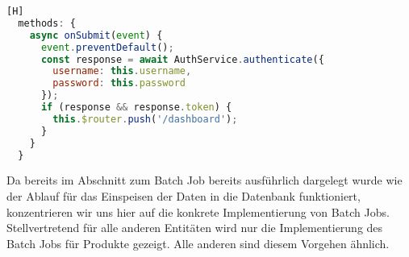 \begin{lstlisting}[language=JavaScript,caption=Ausschnitt aus src/views/Login.vue][H]
  methods: {
    async onSubmit(event) {
      event.preventDefault();
      const response = await AuthService.authenticate({
        username: this.username,
        password: this.password
      });
      if (response && response.token) {
        this.$router.push('/dashboard');
      }
    }
  }
\end{lstlisting}





Da bereits im Abschnitt zum Batch Job bereits ausführlich dargelegt wurde wie der Ablauf für das Einspeisen der Daten in die Datenbank funktioniert, konzentrieren wir uns hier auf die konkrete Implementierung von Batch Jobs. Stellvertretend für alle anderen Entitäten wird nur die Implementierung des Batch Jobs für Produkte gezeigt. Alle anderen sind diesem Vorgehen ähnlich.

